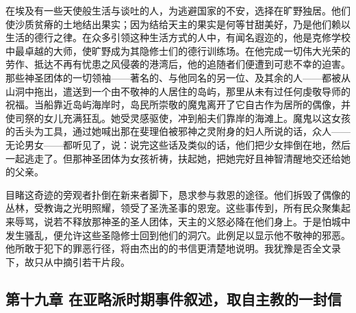 在埃及有一些天使般生活与谈吐的人，为逃避国家的不安，选择在旷野独居。他们使沙质贫瘠的土地结出果实；因为结给天主的果实是何等甘甜美好，乃是他们赖以生活的德行之律。在众多引领这种生活方式的人中，有闻名遐迩的，他是克修学校中最卓越的大师，使旷野成为其隐修士们的德行训练场。在他完成一切伟大光荣的劳作、抵达不再有忧患之风侵袭的港湾后，他的追随者们便遭到可悲不幸的迫害。那些神圣团体的一切领袖——著名的、与他同名的另一位、及其余的人——都被从山洞中拖出，遣送到一个由不敬神的人居住的岛屿，那里从未有过任何虔敬导师的祝福。当船靠近岛屿海岸时，岛民所崇敬的魔鬼离开了它自古作为居所的偶像，并使司祭的女儿充满狂乱。她受灵感驱使，冲到船夫们靠岸的海滩上。魔鬼以这女孩的舌头为工具，通过她喊出那在斐理伯被邪神之灵附身的妇人所说的话，众人——无论男女——都听见了，说：说完这些话及类似的话，他们把少女摔倒在地，然后一起逃走了。但那神圣团体为女孩祈祷，扶起她，把她完好且神智清醒地交还给她的父亲。\par

目睹这奇迹的旁观者扑倒在新来者脚下，恳求参与救恩的途径。他们拆毁了偶像的丛林，受教诲之光明照耀，领受了圣洗圣事的恩宠。这些事传到，所有民众聚集起来辱骂，说若不释放那神圣的圣人团体，天主的义怒必降在他们身上。于是怕城中发生骚乱，便允许这些圣隐修士回到他们的洞穴。此例足以显示他不敬神的邪恶。他所敢于犯下的罪恶行径，将由杰出的的书信更清楚地说明。我犹豫是否全文录下，故只从中摘引若干片段。\par


\subsection{第十九章 在亚略派时期事件叙述，取自主教的一封信}

